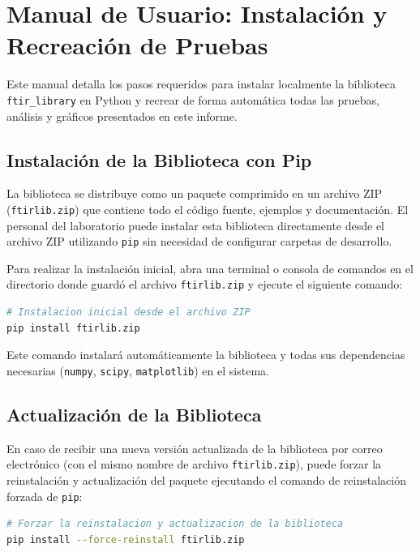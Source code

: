 \documentclass[a4paper,11pt]{article}
\begin{document}
\newpage

\section{Manual de Usuario: Instalación y Recreación de Pruebas}
Este manual detalla los pasos requeridos para instalar localmente la biblioteca \texttt{ftir\_library} en Python y recrear de forma automática todas las pruebas, análisis y gráficos presentados en este informe.

\subsection{Instalación de la Biblioteca con Pip}
La biblioteca se distribuye como un paquete comprimido en un archivo ZIP (\texttt{ftirlib.zip}) que contiene todo el código fuente, ejemplos y documentación. El personal del laboratorio puede instalar esta biblioteca directamente desde el archivo ZIP utilizando \texttt{pip} sin necesidad de configurar carpetas de desarrollo.

Para realizar la instalación inicial, abra una terminal o consola de comandos en el directorio donde guardó el archivo \texttt{ftirlib.zip} y ejecute el siguiente comando:

\begin{lstlisting}[language=bash]
# Instalacion inicial desde el archivo ZIP
pip install ftirlib.zip
\end{lstlisting}

Este comando instalará automáticamente la biblioteca y todas sus dependencias necesarias (\texttt{numpy}, \texttt{scipy}, \texttt{matplotlib}) en el sistema.

\subsection{Actualización de la Biblioteca}
En caso de recibir una nueva versión actualizada de la biblioteca por correo electrónico (con el mismo nombre de archivo \texttt{ftirlib.zip}), puede forzar la reinstalación y actualización del paquete ejecutando el comando de reinstalación forzada de \texttt{pip}:

\begin{lstlisting}[language=bash]
# Forzar la reinstalacion y actualizacion de la biblioteca
pip install --force-reinstall ftirlib.zip
\end{lstlisting}
\end{document}
